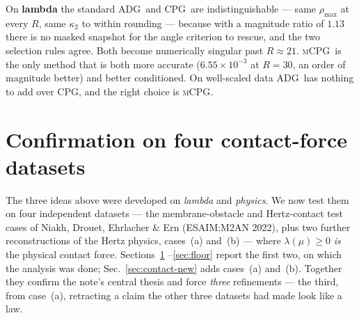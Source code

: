 \documentclass[11pt]{article}
\newcommand{\CPG}{\textsc{CPG}}
\newcommand{\ADG}{\textsc{ADG}}
\newcommand{\mCPG}{\textsc{mCPG}}
\begin{document}
On \textbf{lambda} the standard \ADG\ and \CPG\ are indistinguishable --- same
$\rho_{\max}$ at every $R$, same $\kappa_2$ to within rounding --- because with a
magnitude ratio of $1.13$ there is no masked snapshot for the angle criterion to
rescue, and the two selection rules agree. Both become numerically singular past
$R\approx21$. \mCPG\ is the only method that is both more accurate
($6.55\times10^{-3}$ at $R=30$, an order of magnitude better) and better
conditioned. On well-scaled data \ADG\ has nothing to add over \CPG, and the
right choice is \mCPG.

\section{Confirmation on four contact-force datasets}
\label{sec:contact}

The three ideas above were developed on \emph{lambda} and \emph{physics}. We now
test them on four independent datasets --- the membrane-obstacle and Hertz-contact
test cases of Niakh, Drouet, Ehrlacher \& Ern (ESAIM:M2AN 2022), plus two further
reconstructions of the Hertz physics, cases~(a) and~(b) --- where
$\lambda(\mu)\ge0$ \emph{is} the physical contact force. Sections~\ref{sec:contact}
--\ref{sec:floor} report the first two, on which the analysis was done;
Sec.~\ref{sec:contact-new} adds cases~(a) and~(b). Together they confirm the note's
central thesis and force \emph{three} refinements --- the third, from case~(a),
retracting a claim the other three datasets had made look like a law.
\end{document}
